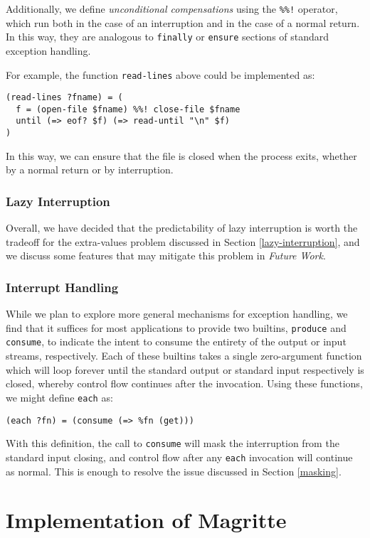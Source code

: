 \documentclass[english,preprint,JIP,uplatex]{ipsj}
\begin{document}
\noindent Additionally, we define \emph{unconditional compensations} using the \verb/%%!/ operator, which run both in the case of an interruption and in the case of a normal return. In this way, they are analogous to \verb/finally/ or \verb/ensure/ sections of standard exception handling.

For example, the function \verb/read-lines/ above could be implemented as:
\begin{lstlisting}
(read-lines ?fname) = (
  f = (open-file $fname) %%! close-file $fname
  until (=> eof? $f) (=> read-until "\n" $f)
)
\end{lstlisting}

\noindent
In this way, we can ensure that the file is closed when the process exits, whether by a normal return or by interruption.

\subsubsection{Lazy Interruption}\noindent
Overall, we have decided that the predictability of lazy interruption is worth the tradeoff for the extra-values problem discussed in Section \ref{lazy-interruption}, and we discuss some features that may mitigate this problem in \emph{Future Work}.

\subsubsection{Interrupt Handling}\noindent
While we plan to explore more general mechanisms for exception handling, we find that it suffices for most applications to provide two builtins, \verb/produce/ and \verb/consume/, to indicate the intent to consume the entirety of the output or input streams, respectively. Each of these builtins takes a single zero-argument function which will loop forever until the standard output or standard input respectively is closed, whereby control flow continues after the invocation. Using these functions, we might define \verb/each/ as:
\begin{lstlisting}
(each ?fn) = (consume (=> %fn (get)))
\end{lstlisting}

\noindent
With this definition, the call to \verb/consume/ will mask the interruption from the standard input closing, and control flow after any \verb/each/ invocation will continue as normal. This is enough to resolve the issue discussed in Section \ref{masking}.

\section{Implementation of Magritte}\label{implementation}
\end{document}
